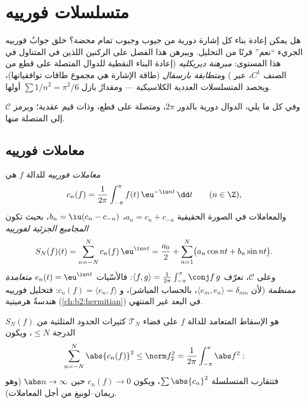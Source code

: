 \chapter{متسلسلات فورييه}\label{ch:b2:fourier}

هل يمكن إعادة بناء كل إشارة دورية من جيوب وجيوب تمام محضة؟
خلق جوابُ فورييه الجريء ``نعم'' قرنًا من التحليل. ويبرهن هذا
الفصل على الركنين اللذين في المتناول في هذا المستوى:
\emph{مبرهنة ديريكليه} (إعادة البناء النقطية للدوال المتصلة على قطع من الصنف $C^1$،
عبر ) و\emph{متطابقة بارسفال} (طاقة
الإشارة هي مجموع طاقات توافقياتها)، ويحصد
المتسلسلات العددية الكلاسيكية --- ومقدارُ بازل $\sum 1/n^2 =
\pi^2/6$ أولها.

وفي كل ما يلي، الدوال دورية بالدور $2\pi$، ومتصلة على قطع،
وذات قيم عقدية؛ ويرمز $\mathcal{C}$ إلى المتصلة منها.

\section{معاملات فورييه}

\begin{definition}\label{def:b2:fourier:coefficients}
\emph{معاملات فورييه} للدالة $f$
هي
\[
c_n(f) = \frac{1}{2\pi}\int_{-\pi}^{\pi} f(t)\,\eu^{-\iu n t}\,\dd
t \qquad (n \in \Z),
\]
والمعاملات في الصورة الحقيقية $a_n = c_n + c_{-n}$، $b_n = \iu(c_n
- c_{-n})$، بحيث تكون \emph{المجاميع الجزئية لفورييه}
\[
S_N(f)(t) = \sum_{n=-N}^{N} c_n(f)\,\eu^{\iu nt}
= \frac{a_0}{2} + \sum_{n=1}^{N}\bigl(a_n\cos nt + b_n \sin
nt\bigr).
\]
وعلى $\mathcal{C}$، نعرّف  $\langle f,
g\rangle = \frac{1}{2\pi}\int_{-\pi}^{\pi}\conj f\,g$: فالأسّيات
$e_n(t) = \eu^{\iu nt}$ \emph{متعامدة ممنظمة}
(لأن $\langle e_m, e_n\rangle = \delta_{mn}$، بالحساب المباشر)، و
$c_n(f) = \langle e_n, f\rangle$: فتحليل فورييه هندسةٌ هرميتية
(\cref{ch:b2:hermitian}) في البعد غير المنتهي.
\end{definition}

\begin{proposition}\label{prop:b2:fourier:bessel}
$S_N(f)$ هو الإسقاط المتعامد للدالة $f$ على فضاء
$\mathcal{T}_N$ كثيرات الحدود المثلثية من الدرجة $\leq N$،
ويكون
\[
\sum_{n=-N}^{N} \abs{c_n(f)}^2 \leq \norm f_2^2 =
\frac{1}{2\pi}\int_{-\pi}^{\pi} \abs f^2 :
\]
فتتقارب المتسلسلة $\sum \abs{c_n}^2$، ويكون $c_n(f) \to 0$ حين
$\abs n \to \infty$ (وهو ريمان--لوبيغ من أجل المعاملات).
\end{proposition}

